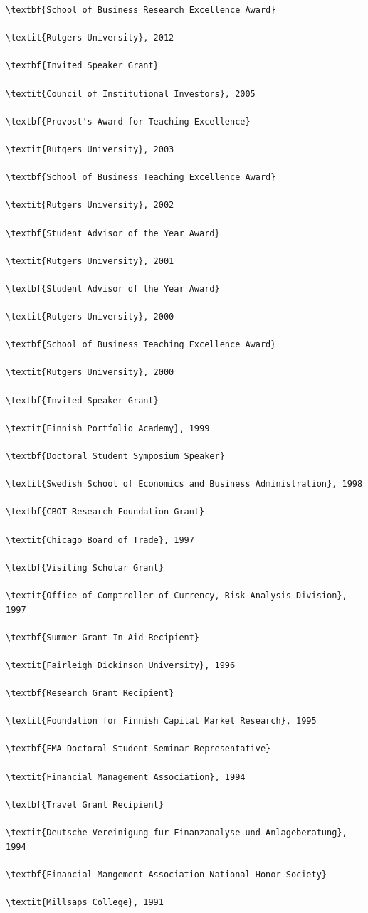 \documentclass[11pt,a4paper,]{awesome-cv}
\begin{document}
\begin{verbatim}
\textbf{School of Business Research Excellence Award}

\textit{Rutgers University}, 2012

\textbf{Invited Speaker Grant}

\textit{Council of Institutional Investors}, 2005

\textbf{Provost's Award for Teaching Excellence}

\textit{Rutgers University}, 2003

\textbf{School of Business Teaching Excellence Award}

\textit{Rutgers University}, 2002

\textbf{Student Advisor of the Year Award}

\textit{Rutgers University}, 2001

\textbf{Student Advisor of the Year Award}

\textit{Rutgers University}, 2000

\textbf{School of Business Teaching Excellence Award}

\textit{Rutgers University}, 2000

\textbf{Invited Speaker Grant}

\textit{Finnish Portfolio Academy}, 1999

\textbf{Doctoral Student Symposium Speaker}

\textit{Swedish School of Economics and Business Administration}, 1998

\textbf{CBOT Research Foundation Grant}

\textit{Chicago Board of Trade}, 1997

\textbf{Visiting Scholar Grant}

\textit{Office of Comptroller of Currency, Risk Analysis Division}, 1997

\textbf{Summer Grant-In-Aid Recipient}

\textit{Fairleigh Dickinson University}, 1996

\textbf{Research Grant Recipient}

\textit{Foundation for Finnish Capital Market Research}, 1995

\textbf{FMA Doctoral Student Seminar Representative}

\textit{Financial Management Association}, 1994

\textbf{Travel Grant Recipient}

\textit{Deutsche Vereinigung fur Finanzanalyse und Anlageberatung}, 1994

\textbf{Financial Mangement Association National Honor Society}

\textit{Millsaps College}, 1991
\end{verbatim}
\end{document}
